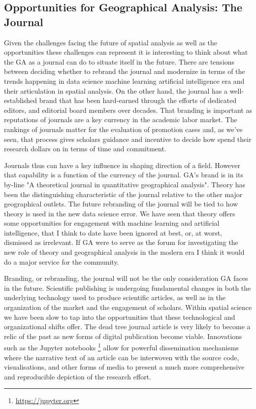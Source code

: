 \documentclass[11pt]{article}
\begin{document}
\subsection{Opportunities for Geographical Analysis: The Journal}
\label{sec:org01c95fd}


Given the challenges facing the future of spatial analysis as well as the
opportunities these challenges can represent it is interesting to think about
what the GA as a journal can do to situate itself in the future. There are
tensions between deciding whether to rebrand the journal and modernize in terms
of the trends happening in data science machine learning artificial intelligence
era and their articulation in spatial analysis. On the other hand, the journal
has a well-established brand that has been hard-earned through the efforts of
dedicated editors, and editorial board members over decades. That branding is
important as reputations of journals are a key currency in the academic labor
market. The rankings of journals matter for the evaluation of promotion cases
and, as we've seen, that process gives scholars guidance and incentive to decide
how spend their research dollars on in terms of time and commitment.

Journals thus can have a key influence in shaping direction of a field. However
that capability is a function of the currency of the journal. GA's brand is in
its by-line "A theoretical journal in quantitative geographical analysis".
Theory has been the distinguishing characteristic of the journal relative to
the other major geographical outlets. The future rebranding of the journal
will be tied to how theory is used in the new data science error. We have seen
that theory offers some opportunities for engagement with machine
learning and artificial intelligence, that I think to date have been ignored at
best, or, at worst, dismissed as irrelevant. If GA were to serve as the forum for
investigating the new role of theory and geographical analysis in the modern
era I think it would do a major service for the community.

Branding, or rebranding, the journal will not be the only consideration GA faces
in the future. Scientific publishing is undergoing fundamental changes in both
the underlying technology used to produce scientific articles, as well as in the
organization of the market and the engagement of scholars. Within spatial
science we have been slow to tap into the opportunities that these technological
and organizational shifts offer. The dead tree journal article is very likely to
become a relic of the past as new forms of digital publication become viable.
Innovations such as the Jupyter notebooks \footnote{\url{https://jupyter.org}}
allow for powerful dissemination mechanisms where the narrative text of an
article can be interwoven with the source code, visualisations, and other forms
of media to present a much more comprehensive and reproducible depiction of the
research effort.
\end{document}
